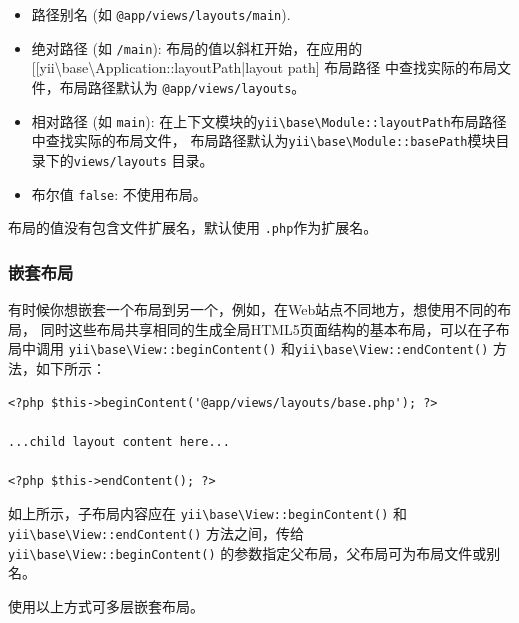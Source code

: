 \begin{itemize}
\item 路径别名 (如 \lstinline|@app/views/layouts/main|).
\item 绝对路径 (如 \lstinline|/main|): 布局的值以斜杠开始，在应用的[[yii{\textbackslash}base{\textbackslash}Application::layoutPath|layout path] 布局路径
中查找实际的布局文件，布局路径默认为 \lstinline|@app/views/layouts|。
\item 相对路径 (如 \lstinline|main|): 在上下文模块的\texttt{yii{\allowbreak{}\textbackslash}base{\allowbreak{}\textbackslash}Module\allowbreak{}::\allowbreak{}layoutPath}布局路径中查找实际的布局文件，
布局路径默认为\texttt{yii{\allowbreak{}\textbackslash}base{\allowbreak{}\textbackslash}Module\allowbreak{}::\allowbreak{}basePath}模块目录下的\lstinline|views/layouts| 目录。
\item 布尔值 \lstinline|false|: 不使用布局。
\end{itemize}
布局的值没有包含文件扩展名，默认使用 \lstinline|.php|作为扩展名。

\subsubsection{嵌套布局 \label{structure-views.md::nested-layouts}}
有时候你想嵌套一个布局到另一个，例如，在Web站点不同地方，想使用不同的布局，
同时这些布局共享相同的生成全局HTML5页面结构的基本布局，可以在子布局中调用
\texttt{yii{\allowbreak{}\textbackslash}base{\allowbreak{}\textbackslash}View\allowbreak{}::\allowbreak{}beginContent()} 和\texttt{yii{\allowbreak{}\textbackslash}base{\allowbreak{}\textbackslash}View\allowbreak{}::\allowbreak{}endContent()}
方法，如下所示：

\lstset{language=php}\begin{lstlisting}
<?php $this->beginContent('@app/views/layouts/base.php'); ?>

...child layout content here...

<?php $this->endContent(); ?>
\end{lstlisting}
如上所示，子布局内容应在 \texttt{yii{\allowbreak{}\textbackslash}base{\allowbreak{}\textbackslash}View\allowbreak{}::\allowbreak{}beginContent()} 和
\texttt{yii{\allowbreak{}\textbackslash}base{\allowbreak{}\textbackslash}View\allowbreak{}::\allowbreak{}endContent()} 方法之间，传给 \texttt{yii{\allowbreak{}\textbackslash}base{\allowbreak{}\textbackslash}View\allowbreak{}::\allowbreak{}beginContent()}
的参数指定父布局，父布局可为布局文件或别名。

使用以上方式可多层嵌套布局。

